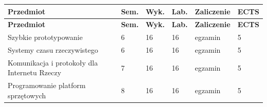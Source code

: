\documentclass[12pt,a4paper]{article}
\newcommand{\thdrule}{\noalign{\global\setlength{\extrarowheight}{0pt}}}
\newcommand{\thdend}{\noalign{\global\setlength{\extrarowheight}{4pt}}}
\begin{document}
{\scriptsize
\begin{longtable}{m{6.5cm}m{0.7cm}m{1cm}m{1cm}m{1.7cm}m{0.7cm}}
\thdrule\toprule
\rowcolor{pjatkRed}
{\color{white}\footnotesize\textbf{\vphantom{Ag}Przedmiot}} & {\color{white}\footnotesize\textbf{\vphantom{Ag}Sem.}} & {\color{white}\footnotesize\textbf{\vphantom{Ag}Wyk.}} & {\color{white}\footnotesize\textbf{\vphantom{Ag}Lab.}} & {\color{white}\footnotesize\textbf{\vphantom{Ag}Zaliczenie}} & {\color{white}\footnotesize\textbf{\vphantom{Ag}ECTS}} \\
\midrule\thdend
\endfirsthead
\thdrule\toprule
\rowcolor{pjatkRed}
{\color{white}\footnotesize\textbf{\vphantom{Ag}Przedmiot}} & {\color{white}\footnotesize\textbf{\vphantom{Ag}Sem.}} & {\color{white}\footnotesize\textbf{\vphantom{Ag}Wyk.}} & {\color{white}\footnotesize\textbf{\vphantom{Ag}Lab.}} & {\color{white}\footnotesize\textbf{\vphantom{Ag}Zaliczenie}} & {\color{white}\footnotesize\textbf{\vphantom{Ag}ECTS}} \\
\midrule\thdend
\endhead
\rowcolor{tableRowLight} Szybkie prototypowanie & 6 & 16 & 16 & {\scriptsize egzamin} & 5 \\
\rowcolor{tableRowAlt} Systemy czasu rzeczywistego & 6 & 16 & 16 & {\scriptsize egzamin} & 5 \\
\rowcolor{tableRowLight} Komunikacja i protokoły dla Internetu Rzeczy & 7 & 16 & 16 & {\scriptsize egzamin} & 5 \\
\rowcolor{tableRowAlt} Programowanie platform sprzętowych & 8 & 16 & 16 & {\scriptsize egzamin} & 5 \\
\bottomrule
\end{longtable}}
\end{document}
